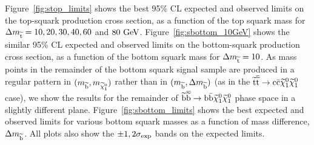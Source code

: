 %
Figure~\ref{fig:stop_limits} shows the best 95\% CL expected and observed limits on the top-squark production cross section, 
as a function of the top squark mass for $\Delta m_{\widetilde{{\rm t}}} = 10, 20, 30, 40, 60$ and $80~\mathrm{GeV}$.
Figure~\ref{fig:sbottom_10GeV} shows the similar 95\% CL expected and observed limits on the bottom-squark production cross section, 
as a function of the bottom squark mass for $\Delta m_{\widetilde{{\rm t}}} = 10$. 
As mass points in the remainder of the bottom squark signal sample are produced in a regular pattern in $(m_{\widetilde{{\rm b}}}, m_{\widetilde{\chi}^{0}_{1}})$ rather than in $(m_{\widetilde{{\rm b}}}, \Delta m_{\widetilde{{\rm b}}})$ (as in the $\widetilde{{\rm t}} \overline{\widetilde{\mathrm{t}}} \rightarrow \rm c \bar{\rm c} \widetilde{\chi}^{0}_{1} \widetilde{\chi}^{0}_{1}$  case), we show the results for the remainder of $\widetilde{{\rm b}} \overline{\widetilde{\mathrm{b}}} \rightarrow \rm b \bar{\rm b} \widetilde{\chi}^{0}_{1} \widetilde{\chi}^{0}_{1}$ phase space in a slightly different plane.
Figure~\ref{fig:sbottom_limits} shows the best expected and observed limits for various bottom squark masses as a function of mass difference, $\Delta m_{\widetilde{{\rm b}}}$.
All plots also show the $\pm1,2 \sigma_{\rm exp}$ bands on the expected limits.




